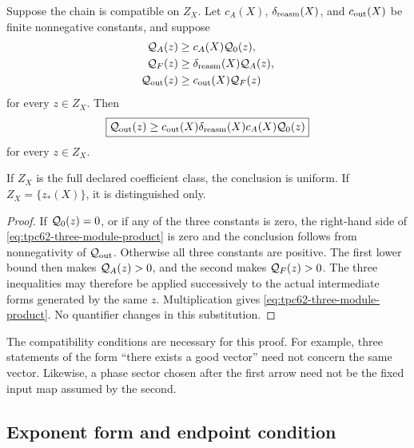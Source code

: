 \begin{theorem}
\label{thm:tpc62-three-module-closure}
Suppose the chain is compatible on \(Z_X\).  Let
\(c_A(X)\), \(\delta_{\rm reasm}(X)\), and \(c_{\rm out}(X)\) be finite
nonnegative constants, and suppose
\begin{align}
 \mathcal Q_A(z)&\ge c_A(X)\mathcal Q_0(z),
 \label{eq:tpc62-represented-module-lower}\\
 \mathcal Q_F(z)&\ge \delta_{\rm reasm}(X)\mathcal Q_A(z),
 \label{eq:tpc62-reassembly-module-lower}\\
 \mathcal Q_{\rm out}(z)&\ge c_{\rm out}(X)\mathcal Q_F(z)
 \label{eq:tpc62-downstream-module-lower}
\end{align}
for every \(z\in Z_X\).  Then
\begin{equation}
 \boxed{
 \mathcal Q_{\rm out}(z)
 \ge c_{\rm out}(X)\delta_{\rm reasm}(X)c_A(X)\mathcal Q_0(z)}
 \label{eq:tpc62-three-module-product}
\end{equation}
for every \(z\in Z_X\).

If \(Z_X\) is the full declared coefficient class, the conclusion is
uniform.  If \(Z_X=\{z_*(X)\}\), it is distinguished only.
\end{theorem}

\begin{proof}
If \(\mathcal Q_0(z)=0\), or if any of the three constants is zero, the
right-hand side of \eqref{eq:tpc62-three-module-product} is zero and the
conclusion follows from nonnegativity of \(\mathcal Q_{\rm out}\).  Otherwise all
three constants are positive.  The first lower bound then makes
\(\mathcal Q_A(z)>0\), and the second makes \(\mathcal Q_F(z)>0\).  The three
inequalities may therefore be applied successively to the actual
intermediate forms generated by the same \(z\).  Multiplication gives
\eqref{eq:tpc62-three-module-product}.  No quantifier changes in this
substitution.
\end{proof}

The compatibility conditions are necessary for this proof.  For example,
three statements of the form ``there exists a good vector'' need not concern
the same vector.  Likewise, a phase sector chosen after the first arrow need
not be the fixed input map assumed by the second.

\subsection{Exponent form and endpoint condition}

